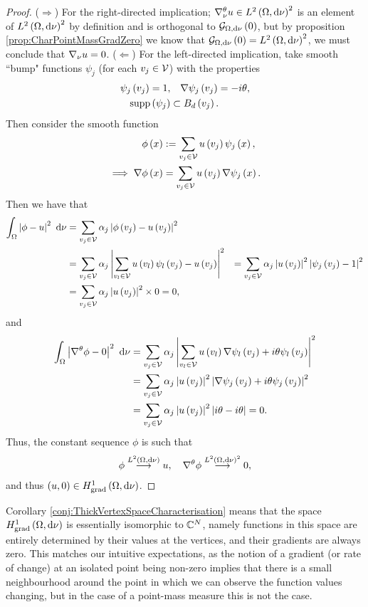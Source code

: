 \begin{proof}
	($\Rightarrow$) For the right-directed implication; $\nabla^{\theta}_{\nu}u\in L^{2}\left( \Omega,\mathrm{d}\nu \right)^2$ is an element of $L^{2}\left( \Omega,\mathrm{d}\nu \right)^2$ by definition and is orthogonal to $\mathcal{G}_{ \Omega, \mathrm{d}\nu}\left( 0 \right)$, but by proposition \ref{prop:CharPointMassGradZero} we know that $\mathcal{G}_{ \Omega, \mathrm{d}\nu}\left( 0 \right)=L^{2}\left( \Omega,\mathrm{d}\nu \right)^2$, we must conclude that $\nabla_{\nu}u = 0$. \newline
	($\Leftarrow$) For the left-directed implication, take smooth ``bump" functions $\psi_j$ (for each $v_j\in\mathcal{V}$) with the properties
	\begin{align*}
		\psi_j\left( v_j \right) = 1, &\quad \nabla\psi_j\left( v_j \right) = -i\theta, \\
		\mathrm{supp}\left( \psi_j \right) &\subset B_{d}\left( v_j \right).
	\end{align*}
	Then consider the smooth function
	\begin{align*}
		\phi\left( x \right) &:= \sum_{v_j\in\mathcal{V}} u\left( v_j \right)\psi_j\left( x \right), \\
		\implies \nabla\phi\left( x \right) &= \sum_{v_j\in\mathcal{V}} u\left( v_j \right)\nabla\psi_j\left( x \right).
	\end{align*}
	Then we have that
	\begin{align*}
		\int_{\Omega}\left\lvert \phi - u \right\rvert^2 \ \mathrm{d}\nu &= \sum_{v_j\in\mathcal{V}} \alpha_j\left\lvert \phi\left( v_j \right) - u\left( v_j \right) \right\rvert^2 \\
		&= \sum_{v_j\in\mathcal{V}} \alpha_j\left\lvert  \sum_{v_l\in\mathcal{V}}u\left( v_l \right)\psi_l\left( v_j \right) - u\left( v_j \right)  \right\rvert^2
		&= \sum_{v_j\in\mathcal{V}} \alpha_j\left\lvert u\left( v_j \right) \right\rvert^2\left\lvert \psi_j\left( v_j \right)-1 \right\rvert^2 \\
		&= \sum_{v_j\in\mathcal{V}} \alpha_j\left\lvert u\left( v_j \right) \right\rvert^2 \times 0 = 0,
	\end{align*}
	and
	\begin{align*}
		\int_{\Omega}\left\lvert \nabla^{\theta}\phi - 0 \right\rvert^2 \ \mathrm{d}\nu 
		&= \sum_{v_j\in\mathcal{V}} \alpha_j\left\lvert  \sum_{v_l\in\mathcal{V}} u\left( v_l \right)\nabla\psi_l\left( v_j \right) + i\theta\psi_l\left( v_j \right)  \right\rvert^2 \\
		&= \sum_{v_j\in\mathcal{V}} \alpha_j\left\lvert u\left( v_j \right) \right\rvert^2 \left\lvert  \nabla\psi_j\left( v_j \right) + i\theta\psi_j\left( v_j \right)  \right\rvert^2 \\
		&= \sum_{v_j\in\mathcal{V}} \alpha_j\left\lvert u\left( v_j \right) \right\rvert^2 \left\lvert  i\theta - i\theta  \right\rvert = 0.
	\end{align*}
	Thus, the constant sequence $\phi$ is such that
	\begin{align*}
		\phi \overset{L^{2}\left( \Omega,\mathrm{d}\nu \right)}{\longrightarrow} u, \quad \nabla^{\theta}\phi \overset{L^{2}\left( \Omega,\mathrm{d}\nu \right)^2}{\longrightarrow} 0,
	\end{align*}
	and thus $\left( u,0 \right)\in H^1_\mathrm{grad}\left( \Omega, \mathrm{d}\nu \right)$.
\end{proof}
Corollary \ref{conj:ThickVertexSpaceCharacterisation} means that the space $H^1_\mathrm{grad}\left( \Omega, \mathrm{d}\nu \right)$ is essentially isomorphic to $\mathbb{C}^N$, namely functions in this space are entirely determined by their values at the vertices, and their gradients are always zero.
This matches our intuitive expectations, as the notion of a gradient (or rate of change) at an isolated point being non-zero implies that there is a small neighbourhood around the point in which we can observe the function values changing, but in the case of a point-mass measure this is not the case.
